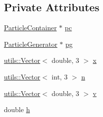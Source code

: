 \subsection*{Private Attributes}
\begin{DoxyCompactItemize}
\item 
\hyperlink{classParticleContainer}{Particle\+Container} $\ast$ \hyperlink{classParticleGeneratorTest_af6e9abb91ece866e34f06dc6e660d508}{pc}
\item 
\hyperlink{classParticleGenerator}{Particle\+Generator} $\ast$ \hyperlink{classParticleGeneratorTest_ae38559da25351b292f3791609022f000}{pg}
\item 
\hyperlink{singletonutils_1_1Vector}{utils\+::\+Vector}$<$ double, 3 $>$ \hyperlink{classParticleGeneratorTest_abc0fcd9dd33eb061b6a97a91c5110a61}{x}
\item 
\hyperlink{singletonutils_1_1Vector}{utils\+::\+Vector}$<$ int, 3 $>$ \hyperlink{classParticleGeneratorTest_a7f6e830f081f3d9910e04d830ece6e0e}{n}
\item 
\hyperlink{singletonutils_1_1Vector}{utils\+::\+Vector}$<$ double, 3 $>$ \hyperlink{classParticleGeneratorTest_a5268544a0e8f86fa20de989cda122542}{v}
\item 
double \hyperlink{classParticleGeneratorTest_ab92e4ddbfd4a0d3ff35537e0775f5cd6}{h}
\end{DoxyCompactItemize}


